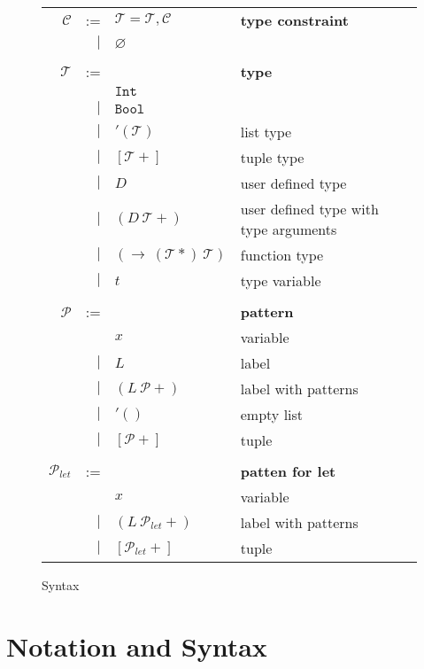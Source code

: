 \documentclass{article}
\begin{document}
\begin{figure}[tb]
    \centering
    \begin{tabular}{rrll}
    $\mathcal{C}$ & := & $\mathcal{T} = \mathcal{T}, \mathcal{C}$ & \bf{type constraint} \\
        & $|$ & $\varnothing$ \\ \\

    $\mathcal{T}$ & := & & \bf{type} \\
        &     & $\mathtt{Int}$ \\
        & $|$ & $\mathtt{Bool}$ \\
        & $|$ & $'(\mathcal{T})$ & list type \\
        & $|$ & $[\mathcal{T}+]$ & tuple type \\
        & $|$ & $D$    & user defined type \\
        & $|$ & $(D\ \mathcal{T}+)$ & user defined type with type arguments \\
        & $|$ & $(\rightarrow\ (\mathcal{T}*)\ \mathcal{T})$ & function type \\
        & $|$ & $t$ & type variable \\ \\

    $\mathcal{P}$ & := & & \bf{pattern} \\
        &     & $x$ & variable \\
        & $|$ & $L$ & label \\
        & $|$ & $(L\ \mathcal{P}+)$ & label with patterns \\
        & $|$ & $'()$ & empty list \\
        & $|$ & $[\mathcal{P}+]$ & tuple \\ \\

    $\mathcal{P}_{let}$ & := & & \bf{patten for let} \\
        &     & $x$ & variable \\
        & $|$ & $(L\ \mathcal{P}_{let}+)$ & label with patterns \\
        & $|$ & $[\mathcal{P}_{let}+]$ & tuple \\
    \end{tabular}
    \caption{Syntax}
    \label{fig:syntax}
\end{figure}

\section{Notation and Syntax}
\end{document}
